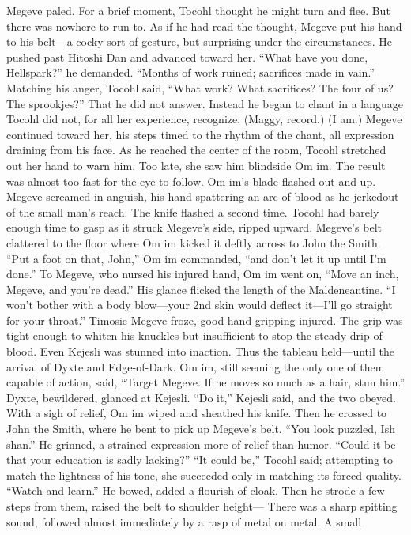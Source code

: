 \documentclass[9pt]{article}
\begin{document}
Megeve paled. For a brief moment, Tocohl thought he might turn and flee. But there was nowhere to
run to. As if he had read the thought, Megeve put his hand to his belt—a cocky sort of gesture, but
surprising under the circumstances.
He pushed past Hitoshi Dan and advanced toward her. “What have you done, Hellspark?” he
demanded. “Months of work ruined; sacrifices made in vain.”
Matching his anger, Tocohl said, “What work? What sacrifices? The four of us? The sprookjes?”
That he did not answer. Instead he began to chant in a language Tocohl did not, for all her
experience, recognize. (Maggy, record.)
(I am.)
Megeve continued toward her, his steps timed to the rhythm of the chant, all expression draining from
his face.
As he reached the center of the room, Tocohl stretched out her hand to warn him.
Too late, she saw him blindside Om im. The result was almost too fast for the eye to follow. Om im’s
blade flashed out and up. Megeve screamed in anguish, his hand spattering an arc of blood as he jerkedout of the small man’s reach.
The knife flashed a second time. Tocohl had barely enough time to gasp as it struck Megeve’s side,
ripped upward. Megeve’s belt clattered to the floor where Om im kicked it deftly across to John the
Smith. “Put a foot on that, John,” Om im commanded, “and don’t let it up until I’m done.”
To Megeve, who nursed his injured hand, Om im went on, “Move an inch, Megeve, and you’re
dead.” His glance flicked the length of the Maldeneantine. “I won’t bother with a body blow—your 2nd
skin would deflect it—I’ll go straight for your throat.”
Timosie Megeve froze, good hand gripping injured. The grip was tight enough to whiten his knuckles
but insufficient to stop the steady drip of blood.
Even Kejesli was stunned into inaction. Thus the tableau held—until the arrival of Dyxte and
Edge-of-Dark. Om im, still seeming the only one of them capable of action, said, “Target Megeve. If he
moves so much as a hair, stun him.”
Dyxte, bewildered, glanced at Kejesli. “Do it,” Kejesli said, and the two obeyed. With a sigh of
relief, Om im wiped and sheathed his knife. Then he crossed to John the Smith, where he bent to pick up
Megeve’s belt.
“You look puzzled, Ish shan.” He grinned, a strained expression more of relief than humor. “Could it
be that your education is sadly lacking?”
“It could be,” Tocohl said; attempting to match the lightness of his tone, she succeeded only in
matching its forced quality.
“Watch and learn.” He bowed, added a flourish of cloak. Then he strode a few steps from them,
raised the belt to shoulder height—
There was a sharp spitting sound, followed almost immediately by a rasp of metal on metal. A small
\end{document}
